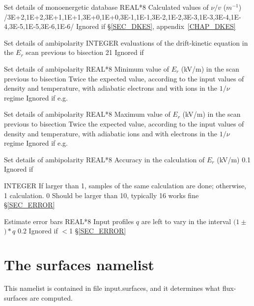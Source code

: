 {Set details of monoenergetic database}
{REAL*8}
{Calculated values of $\nu/v$ ($m^{-1}$)}
{/3E+2,1E+2,3E+1,1E+1,3E+0,1E+0,3E-1,1E-1,3E-2,1E-2,3E-3,1E-3,3E-4,1E-4,3E-5,1E-5,3E-6,1E-6/}
{Ignored if \notf{}}
{\S\ref{SEC_DKES}, appendix~\ref{CHAP_DKES}}

{Set details of ambipolarity}
{INTEGER}
{ evaluations of the drift-kinetic equation in the $E_r$ scan previous to bisection}
{21}
{Ignored if \notf{}}
{}%

{Set details of ambipolarity}
{REAL*8}
{Minimum value of $E_r$ (kV/m) in the scan previous to bisection}
{Twice the expected value, according to the input values of density and temperature, with adiabatic electrons and with ions in the $1/\nu$ regime}
{Ignored if \notf{}}
{e.g. \citep{maassberg1999densitycontrol}}

{Set details of ambipolarity}
{REAL*8}
{Maximum value of $E_r$ (kV/m) in the scan previous to bisection}
{Twice the expected value, according to the input values of density and temperature,  with adiabatic ions and with electrons in the $1/\nu$ regime}
{Ignored if \notf{}}
{e.g. \citep{maassberg1999densitycontrol}}

{Set details of ambipolarity}
{REAL*8}
{Accuracy in the calculation of $E_r$ (kV/m)}
{0.1}
{Ignored if \notf{}}
{}%

{}
{INTEGER}
{If larger than 1,  samples of the same calculation are done; otherwise, 1 calculation.}
{0}
{Should be larger than 10, typically 16 works fine}
{\S\ref{SEC_ERROR}}

{Estimate error bars}
{REAL*8}
{Input profiles $q$ are left to vary in the interval $(1\pm $$)*q$}
{0.2}
{Ignored if $<$1}
{\S\ref{SEC_ERROR}}




\section{The {\ttfamily surfaces} namelist}\label{SEC_SURF}

This namelist is contained in file {\ttfamily input.surfaces}, and it determines what flux-surfaces are computed. 

